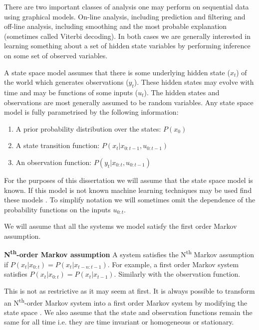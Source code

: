 There are two important classes of analysis one may perform on sequential data using graphical models. On-line analysis, including prediction and filtering and off-line analysis, including smoothing and the most probable explanation (sometimes called Viterbi decoding). In both cases we are generally interested in learning something about a set of hidden state variables by performing inference on some set of observed variables. 

A state space model assumes that there is some underlying hidden state ($x_t$) of the world which generates observations ($y_t$). These hidden states may evolve with time and may be functions of some inputs ($u_t$). The hidden states and observations are most generally assumed to be random variables. Any state space model is fully parametrised by the following information:
\begin{enumerate}
\item
A prior probability distribution over the states: $P(x_0)$
\item
A state transition function: $P(x_t|x_{0:t-1}, u_{0:t-1})$
\item
An observation function: $P(y_t|x_{0:t}, u_{0:t-1})$
\end{enumerate} 
For the purposes of this dissertation we will assume that the state space model is known. If this model is not known machine learning techniques may be used find these models \cite{murphy1}. To simplify notation we will sometimes omit the dependence of the probability functions on the inputs $u_{0:t}$.

We will assume that all the systems we model satisfy the first order Markov assumption.
\begin{defn}
\textbf{N\textsuperscript{th}-order Markov assumption} A system satisfies the N\textsuperscript{th} Markov assumption if $P(x_t|x_{0:t})=P(x_t|x_{t-n:t-1})$. For example, a first order Markov system satisfies  $P(x_t|x_{0:t})=P(x_t|x_{t-1})$. Similarly with the observation function.
\label{def_order_markov}
\end{defn}
This is not as restrictive as it may seem at first. It is always possible to transform an N\textsuperscript{th}-order Markov system into a first order Markov system by modifying the state space \cite{murphy1}. We also assume that the state and observation functions remain the same for all time i.e. they are time invariant or homogeneous or stationary.

